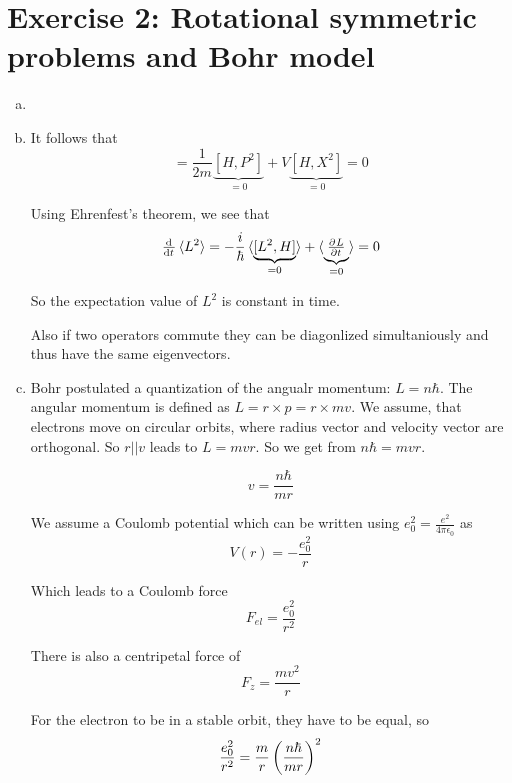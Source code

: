 \documentclass[a4paper,german,12pt,smallheadings]{scrartcl}
\begin{document}
\section*{Exercise 2: Rotational symmetric problems and Bohr model}
\begin{enumerate}[a)]
  \item
  \item
    It follows that
    \begin{equation*}
    [H, L^2] = \frac{1}{2m} \underbrace{[H, P^2]}_{=0} + V \underbrace{[H, X^2]}_{=0} = 0
    \end{equation*}

    Using Ehrenfest's theorem, we see that
    \begin{equation*}
      \od{}{t} \braket{L^2} = -\frac{i}{\hbar} \braket{\underbrace{[L^2, H]}_{=0}} + \braket{\underbrace{\pd{L}{t}}_{=0}} = 0
    \end{equation*}

    So the expectation value of $L^2$ is constant in time.

    Also if two operators commute they can be diagonlized simultaniously and
    thus have the same eigenvectors.
  \item
    Bohr postulated a quantization of the angualr momentum: $L = n \hbar$. The
    angular momentum is defined as $L = r \times p = r \times mv$. We assume,
    that electrons move on circular orbits, where radius vector and velocity
    vector are orthogonal. So $r || v$ leads to $L = mvr$. So we get from $n
    \hbar = mvr$.

    \begin{equation*}
      v = \frac{n \hbar}{mr}
    \end{equation*}

    We assume a Coulomb potential which can be written using $e_0^2 =
    \frac{e^2}{4 \pi \epsilon_0}$ as
    \begin{equation*}
      V(r) = - \frac{e_0^2}{r}
    \end{equation*}

    Which leads to a Coulomb force
    \begin{equation*}
      F_{el} = \frac{e_0^2}{r^2}
    \end{equation*}

    There is also a centripetal force of
    \begin{equation*}
      F_{z} = \frac{mv^2}{r}
    \end{equation*}

    For the electron to be in a stable orbit, they have to be equal, so
    \begin{equation*}
      \frac{e_0^2}{r^2} = \frac{m}{r} \del{\frac{n \hbar}{m r}}^2
    \end{equation*}


\end{enumerate}
\end{document}
